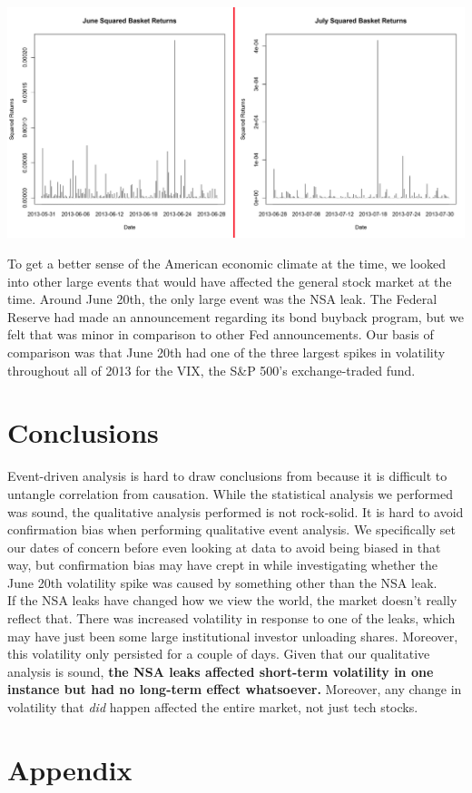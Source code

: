 \documentclass[11pt]{amsart}
\begin{document}
\centerline{\includegraphics[scale=0.7]{june+july_squared_ret.pdf}}

To get a better sense of the American economic climate at the time, we looked into other large events that would have affected the general stock market at the time. Around June 20th, the only large event was the NSA leak. The Federal Reserve had made an announcement regarding its bond buyback program, but we felt that was minor in comparison to other Fed announcements. Our basis of comparison was that June 20th had one of the three largest spikes in volatility throughout all of 2013 for the VIX, the S\&P 500's exchange-traded fund. \\

\section{Conclusions}
Event-driven analysis is hard to draw conclusions from because it is difficult to untangle correlation from causation. While the statistical analysis we performed was sound, the qualitative analysis performed is not rock-solid. It is hard to avoid confirmation bias when performing qualitative event analysis. We specifically set our dates of concern before even looking at data to avoid being biased in that way, but confirmation bias may have crept in while investigating whether the June 20th volatility spike was caused by something other than the NSA leak. \\

If the NSA leaks have changed how we view the world, the market doesn't really reflect that. There was increased volatility in response to one of the leaks, which may have just been some large institutional investor unloading shares. Moreover, this volatility only persisted for a couple of days. Given that our qualitative analysis is sound, \textbf{the NSA leaks affected short-term volatility in one instance but had no long-term effect whatsoever.} Moreover, any change in volatility that \textit{did} happen affected the entire market, not just tech stocks. \\

\newpage
\section{Appendix}
\end{document}
